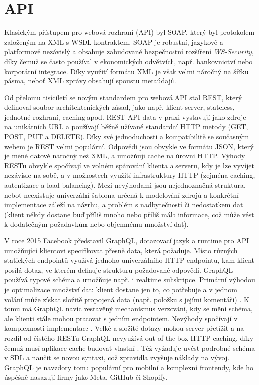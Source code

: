 \section{API}
\label{sec:research-api}

Klasickým přístupem pro webová rozhraní (API) byl SOAP, který byl protokolem
založeným na XML s WSDL kontraktem. SOAP je robustní, jazykově a platformově
nezávislý a obsahuje zabudované bezpečnostní rozšíření \emph{WS-Security},
díky čemuž se často používal v ekonomických odvětvích, např. bankovnictví
nebo korporátní integrace. Díky využití formátu XML je však velmi náročný
na šířku pásma, neboť XML zprávy obsahují spoustu metaúdajů.
\cite{YHVfLHsNlUItkF6G,Sj7FFY7SXnJ6m41T} %

Od přelomu tisíciletí se novým standardem pro webová API stal REST, který
definoval soubor architektonických zásad, jako např. klient-server, stateless,
jednotné rozhraní, caching apod. REST API data v praxi vystavují jako zdroje
na unikátních URL a používají běžně užívané standardní HTTP metody (GET, POST,
PUT a DELETE). Díky své jednoduchosti a kompatibilitě se současným webem
je REST velmi populární. Odpovědi jsou obvykle ve formátu JSON, který je méně
datově náročný než XML, a umožňují cache na úrovni HTTP. Výhody RESTu obvykle
spočívají ve volném spárování klienta a serveru, kdy je lze vyvíjet nezávisle
na sobě, a v možnostech využití infrastruktury HTTP (zejména caching,
autentizace a load balancing). Mezi nevýhodami jsou nejednoznačná struktura,
neboť neexistuje univerzální šablona určená k modelování zdrojů a konkrétní
implementace záleží na návrhu, a problém s nadbytečností či nedostatkem dat
(klient někdy dostane buď příliš mnoho nebo příliš málo informace,
což může vést k dodatečným požadavkům nebo objemnému množství dat).
\cite{YHVfLHsNlUItkF6G,Sj7FFY7SXnJ6m41T} %

V roce 2015 Facebook představil GraphQL, dotazovací jazyk a runtime pro API
umožňující klientovi specifikovat přesně data, která požaduje. Místo různých
statických endpointů využívá jednoho univerzálního HTTP endpointu, kam klient
posílá dotaz, ve kterém definuje strukturu požadované odpovědi. GraphQL
používá typové schéma a umožňuje např. i realtime subskripce. Primární výhodou
je optimalizace množství dat: klient dostane jen to, co potřebuje a v jednom
volání může získat složitě propojená data (např. položku s jejími komentáři)
\cite{YHVfLHsNlUItkF6G,Sj7FFY7SXnJ6m41T}. %
K tomu má GraphQL navíc vestavěný mechanismus verzování, kdy se mění schéma,
ale klienti stále mohou pracovat s jedním endpointem.
Nevýhody spočívají v komplexnosti implementace
\cite{YHVfLHsNlUItkF6G,Sj7FFY7SXnJ6m41T}. %
Velké a složité dotazy mohou server přetížit a na rozdíl od čistého RESTu
GraphQL nevyužívá out-of-the-box HTTP caching, díky čemuž musí aplikace cache
budovat vlastní \cite{YHVfLHsNlUItkF6G,Sj7FFY7SXnJ6m41T}. %
Též vyžaduje uvést podrobné schéma v SDL a naučit se novou syntaxi,
což zpravidla zvyšuje náklady na vývoj. GraphQL je navzdory tomu populární
pro mobilní a komplexní frontendy, kde ho úspěšně nasazují firmy jako Meta,
GitHub či Shopify.

